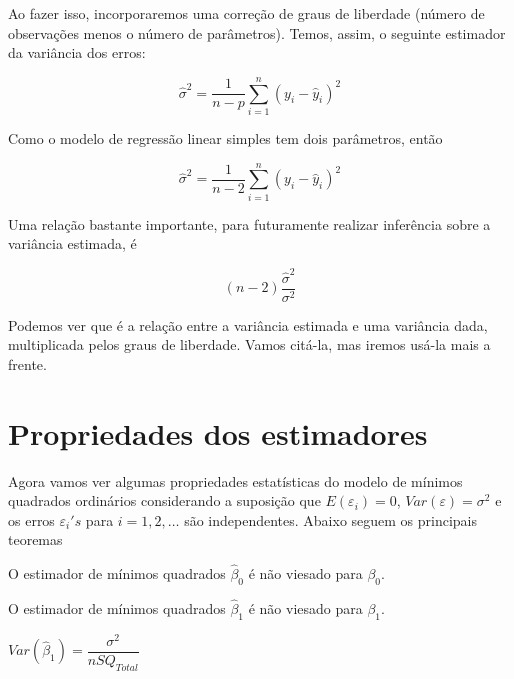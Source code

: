 \noindent Ao fazer isso, incorporaremos uma correção de graus de liberdade (número de observações menos o número de parâmetros). Temos, assim, o seguinte estimador da variância dos erros:

\begin{equation}
    \label{eq:eq47}
        \hat{\sigma}^2 = \dfrac{1}{n - p} \sum_{i=1}^{n} (y_i - \hat{y}_i)^2
\end{equation}

\noindent Como o modelo de regressão linear simples tem dois parâmetros, então

\begin{equation}
    \label{eq:eq48}
        \boxed{\hat{\sigma}^2 = \dfrac{1}{n - 2} \sum_{i=1}^{n} (y_i - \hat{y}_i)^2}
\end{equation}

\noindent Uma relação bastante importante, para futuramente realizar inferência sobre a variância estimada, é 

\begin{equation}
    \label{eq:eq49}
    (n-2)\dfrac{\hat{\sigma}^2}{\sigma^2}
\end{equation}

\noindent Podemos ver que é a relação entre a variância estimada e uma variância dada, multiplicada pelos graus de liberdade. Vamos citá-la, mas iremos usá-la mais a frente.

\section{Propriedades dos estimadores}

\noindent Agora vamos ver algumas propriedades estatísticas do modelo de mínimos quadrados ordinários considerando a suposição que $E(\varepsilon_i) = 0$, $Var(\varepsilon) = \sigma^2$ e os erros $\varepsilon_i's$ para $i=1,2,\dots$ são independentes. Abaixo seguem os principais teoremas

\begin{teorema}
O estimador de mínimos quadrados $\hat{\beta}_0$ é não viesado para $\beta_0$.
\end{teorema}

\begin{teorema}
O estimador de mínimos quadrados $\hat{\beta}_1$ é não viesado para $\beta_1$.
\end{teorema}

\begin{teorema}
$Var(\hat{\beta}_1) = \dfrac{\sigma^2}{nSQ_{Total}}$
\end{teorema}

